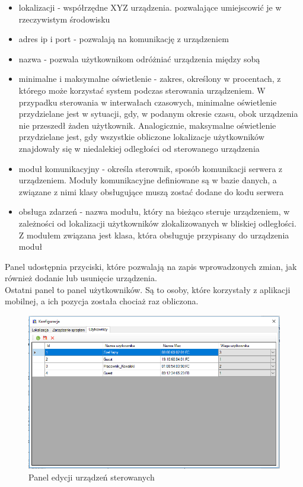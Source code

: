 \documentclass{article}
\begin{document}
		\begin{itemize}
			\item lokalizacji - współrzędne XYZ urządzenia. pozwalające umiejscowić je w rzeczywistym środowisku
			\item adres ip i port - pozwalają na komunikację z urządzeniem
			\item nazwa - pozwala użytkownikom odróżniać urządzenia między sobą
			\item minimalne i maksymalne oświetlenie - zakres, określony w procentach, z którego może korzystać system podczas sterowania urządzeniem. W przypadku sterowania w interwałach czasowych, minimalne oświetlenie przydzielane jest w sytuacji, gdy, w podanym okresie czasu, obok urządzenia nie przeszedł żaden użytkownik. Analogicznie, maksymalne oświetlenie przydzielane jest, gdy wszystkie obliczone lokalizacje użytkowników znajdowały się w niedalekiej odległości od sterowanego urządzenia
			\item moduł komunikacyjny - określa sterownik, sposób komunikacji serwera z urządzeniem. Moduły komunikacyjne definiowane są w bazie danych, a związane z nimi klasy obsługujące muszą zostać dodane do kodu serwera
			\item obsługa zdarzeń - nazwa modułu, który na bieżąco steruje urządzeniem, w zależności od lokalizacji użytkowników zlokalizowanych w bliskiej odległości. Z modułem związana jest klasa, która obsługuje przypisany do urządzenia moduł
		\end{itemize}
		Panel udostępnia przyciski, które pozwalają na zapis wprowadzonych zmian, jak również dodanie lub usunięcie urządzenia.\\
		Ostatni panel to panel użytkowników. Są to osoby, które korzystały z aplikacji mobilnej, a ich pozycja została chociaż raz obliczona.
		\begin{figure}[H]			
			\centering
			\caption{Panel edycji urządzeń sterowanych}
			\includegraphics[width=1.0\textwidth]{panel_konf_users}
		\end{figure}
\end{document}
